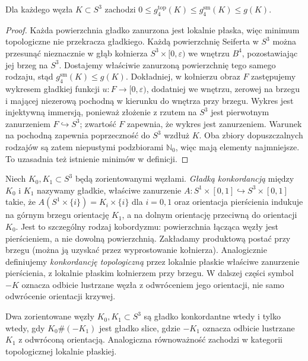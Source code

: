 \begin{stwierdzenie}
Dla każdego węzła $K\subset S^3$ zachodzi
$0\leq g_4^{\mathrm{top}}(K)\leq g_4^{\mathrm{sm}}(K)\leq g(K)$.
\end{stwierdzenie}

\begin{proof}
Każda powierzchnia gładko zanurzona jest lokalnie płaska,
więc minimum topologiczne nie przekracza gładkiego.
Każdą powierzchnię Seiferta w $S^3$ można przesunąć
nieznacznie w głąb kołnierza $S^3\times[0,\varepsilon)$
we wnętrzu $B^4$, pozostawiając jej brzeg na $S^3$.
Dostajemy właściwie zanurzoną powierzchnię tego samego
rodzaju, stąd $g_4^{\mathrm{sm}}(K)\leq g(K)$.
Dokładniej, w kołnierzu obraz $F$ zastępujemy
wykresem gładkiej funkcji $u:F\to[0,\varepsilon)$,
dodatniej we wnętrzu, zerowej na brzegu i mającej
niezerową pochodną w kierunku do wnętrza przy brzegu.
Wykres jest injektywną immersją, ponieważ
złożenie z rzutem na $S^3$ jest pierwotnym
zanurzeniem $F\hookrightarrow S^3$; zwartość
$F$ zapewnia, że wykres jest zanurzeniem.
Warunek na pochodną zapewnia poprzeczność
do $S^3$ wzdłuż $K$.
Oba zbiory dopuszczalnych rodzajów są zatem
niepustymi podzbiorami $\mathbb N_0$, więc mają
elementy najmniejsze. To uzasadnia też istnienie
minimów w definicji.
\end{proof}

\begin{definicja}
Niech $K_0,K_1\subset S^3$ będą zorientowanymi węzłami.
\emph{Gładką konkordancją} między $K_0$ i $K_1$ nazywamy
gładkie, właściwe zanurzenie
$A\colon S^1\times[0,1]\hookrightarrow S^3\times[0,1]$
takie, że $A(S^1\times\{i\})=K_i\times\{i\}$ dla $i=0,1$
oraz orientacja pierścienia indukuje na górnym
brzegu orientację $K_1$, a na dolnym orientację
przeciwną do orientacji $K_0$.
Jest to szczególny rodzaj kobordyzmu: powierzchnia
łącząca węzły jest pierścieniem, a nie dowolną
powierzchnią. Zakładamy produktową postać przy
brzegu (można ją uzyskać przez wyprostowanie
kołnierza). Analogicznie definiujemy
\emph{konkordancję topologiczną} przez lokalnie
płaskie właściwe zanurzenie pierścienia,
z lokalnie płaskim kołnierzem przy brzegu.
W dalszej części symbol $-K$ oznacza odbicie
lustrzane węzła z odwróceniem jego orientacji,
nie samo odwrócenie orientacji krzywej.
\end{definicja}

\begin{stwierdzenie}
\label{st:kt-concordance-slice}
Dwa zorientowane węzły $K_0,K_1\subset S^3$ są gładko
konkordantne wtedy i tylko wtedy, gdy
$K_0\#(-K_1)$ jest gładko slice, gdzie $-K_1$
oznacza odbicie lustrzane $K_1$ z odwróconą orientacją.
Analogiczna równoważność zachodzi w kategorii topologicznej
lokalnie płaskiej.
\end{stwierdzenie}

